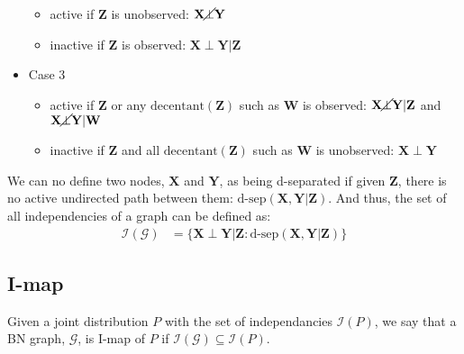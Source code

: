 \documentclass[11pt]{article}
\newcommand{\SetOf}[1]{\mathbf{#1}} %
\newcommand{\Eq}[1]{\begin{align*}#1\end{align*}} %
\newcommand{\cursive}[1]{\mathcal{#1}}
\begin{document}
\begin{itemize}
\begin{center}
		\end{center}

		\begin{itemize}
			\item active if $\SetOf{Z}$ is unobserved: $\SetOf{X} \cancel{\perp} \SetOf{Y}$
			\item inactive if $\SetOf{Z}$ is observed: $\SetOf{X} \perp \SetOf{Y} | \SetOf{Z}$
		\end{itemize}

		\item Case 3
		\begin{center}
		\end{center}

		\begin{itemize}
			\item active if $\SetOf{Z}$ or any $\text{decentant}(\SetOf{Z})$ such as $\SetOf{W}$ is observed: $\SetOf{X} \cancel{\perp} \SetOf{Y}|\SetOf{Z}$ and $\SetOf{X} \cancel{\perp} \SetOf{Y}|\SetOf{W}$
			\item inactive if $\SetOf{Z}$ and all $\text{decentant}(\SetOf{Z})$ such as $\SetOf{W}$ is unobserved: $\SetOf{X}\perp \SetOf{Y}$
		\end{itemize}
	\end{itemize}

	We can no define two nodes, $\SetOf{X}$ and $\SetOf{Y}$, as being d-separated if given $\SetOf{Z}$, there is no active undirected path between them: $\text{d-sep}(\SetOf{X},\SetOf{Y}|\SetOf{Z})$. And thus, the set of all independencies of a graph can be defined as:
	\Eq{\cursive{I}(\cursive{G}) &= \{ \SetOf{X} \perp \SetOf{Y} | \SetOf{Z} : \text{d-sep}(\SetOf{X},\SetOf{Y}|\SetOf{Z}) \}}

	\subsection{I-map}

	Given a joint distribution $P$ with the set of independancies $\cursive{I}(P)$, we say that a BN graph, $\cursive{G}$, is I-map of $P$ if $\cursive{I}(\cursive{G}) \subseteq \cursive{I}(P)$. 
\end{document}
